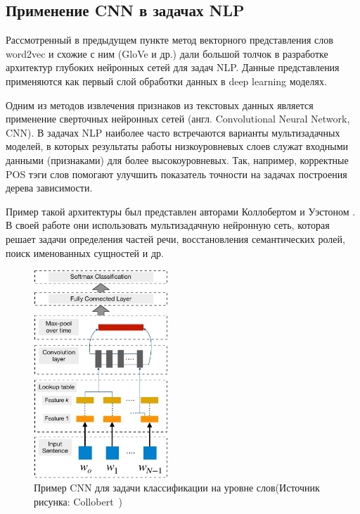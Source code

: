 \subsection{Применение CNN в задачах NLP}
\label{subsec:cnn}


Рассмотренный в предыдущем пункте метод векторного представления слов word2vec и схожие с ним (GloVe и др.) дали большой толчок в разработке архитектур глубоких нейронных сетей для задач NLP. Данные представления применяются  как первый слой обработки данных в deep learning моделях. 

Одним из методов извлечения признаков из текстовых данных является применение сверточных нейронных сетей (англ. Convolutional Neural Network, CNN).
В задачах NLP наиболее часто встречаются варианты мультизадачных моделей, в которых результаты работы низкоуровневых слоев служат входными данными (признаками) для более высокоуровневых. Так, например, корректные POS тэги слов помогают улучшить показатель точности на задачах построения дерева зависимости. 

Пример такой архитектуры был представлен авторами Коллобертом и Уэстоном \autocite{DBLP:journals/corr/abs-1103-0398}. В своей работе они использовать мультизадачную нейронную сеть, которая решает задачи определения частей речи, восстановления семантических ролей, поиск именованных сущностей и др. 

\begin{figure}[t]

\centering
\includegraphics[width=0.45\textwidth]{img/collobertCNN.pdf}
\caption{\label{fig:collobertCNN}Пример CNN для задачи классификации на уровне слов\hspace{\textwidth}(Источник рисунка: Collobert~\autocite{10.1145/1390156.1390177})}
\end{figure}

